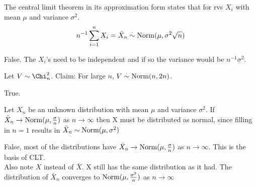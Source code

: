 \documentclass[tf-tutorial-all.tex]{subfiles}
\begin{document}
\begin{truefalse}
  The central limit theorem in its approximation form states that for
  rvs $X_i$ with mean $\mu$ and variance $\sigma^2$.
  $$ n^{-1}\sum_{i=1}^n X_i = \bar X_n \stackrel{\cdot}\sim \mathrm{Norm}(\mu, \sigma^2 \sqrt{n}) $$
\begin{solution}
False. The $X_i$'s need to be independent and if so the variance would be $n^{-1}\sigma^2$.
\end{solution}
\end{truefalse}

\begin{truefalse}
  Let $V \sim \Chi^2_n$. Claim: For large $n$, $V \stackrel{\cdot}\sim \mathrm{Norm}(n, 2n)$.
\begin{solution}
True.
\end{solution}
\end{truefalse}

\begin{truefalse}
Let $X_{n}$ be an unknown distribution with mean $\mu $ and variance $\sigma^{2}$. If $\bar{X}_{n} \to \mathrm{Norm}(\mu, \frac{\sigma}{n})$ as $n \to \infty$
then X must be distributed as normal, since filling in $ n=1 $ results in $\bar{X}_{n} \sim \mathrm{Norm}(\mu, \sigma^{2})$
\begin{solution}
False, most of the distributions have $\bar{X}_{n} \to \mathrm{Norm}(\mu, \frac{\sigma}{n})$ as $n \to \infty$. This is the basis of CLT. 
\\Also note $X $ instead of $\bar{X}$. X still has the same distribution as it had. The distribution of $\bar{X}_{n}$ converges to $\mathrm{Norm}(\mu, \frac{\sigma^{2}}{n}) $ as $n \to \infty$

\end{solution}
\end{truefalse}
\end{document}
